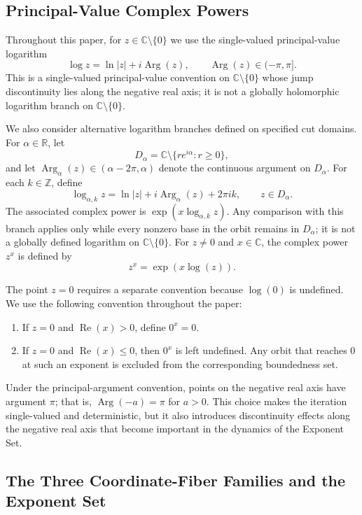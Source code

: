 \documentclass[12pt,a4paper]{amsart}
\theoremstyle{remark}
\newcommand{\C}{\mathbb{C}}
\newcommand{\R}{\mathbb{R}}
\newcommand{\Z}{\mathbb{Z}}
\begin{document}
\subsection{Principal-Value Complex Powers}

Throughout this paper, for $z\in\C\setminus\{0\}$ we use the single-valued
principal-value logarithm
\[
\log z=\ln|z|+i\operatorname{Arg}(z),
\qquad
\operatorname{Arg}(z)\in(-\pi,\pi].
\]
This is a single-valued principal-value convention on
$\C\setminus\{0\}$ whose jump discontinuity lies along the negative real
axis; it is not a globally holomorphic logarithm branch on
$\C\setminus\{0\}$.

We also consider alternative logarithm branches defined on specified cut
domains. For $\alpha\in\R$, let
\[
D_\alpha
=
\C\setminus\{re^{i\alpha}:r\ge0\},
\]
and let $\operatorname{Arg}_\alpha(z)\in(\alpha-2\pi,\alpha)$ denote the
continuous argument on $D_\alpha$. For each $k\in\Z$, define
\[
\log_{\alpha,k}z
=
\ln|z|+i\operatorname{Arg}_\alpha(z)+2\pi i k,
\qquad z\in D_\alpha.
\]
The associated complex power is $\exp(x\log_{\alpha,k}z)$. Any comparison
with this branch applies only while every nonzero base in the orbit remains in
$D_\alpha$; it is not a globally defined logarithm on $\C\setminus\{0\}$.
For $z\ne 0$ and $x\in\C$, the complex power $z^x$ is defined by
\[
z^x=\exp(x\log(z)).
\]

The point $z=0$ requires a separate convention because $\log(0)$ is undefined.
We use the following convention throughout the paper:
\begin{enumerate}
    \item If $z=0$ and $\operatorname{Re}(x)>0$, define $0^x=0$.
    \item If $z=0$ and $\operatorname{Re}(x)\le 0$, then $0^x$ is left
    undefined. Any orbit that reaches $0$ at such an exponent is excluded
    from the corresponding boundedness set.
\end{enumerate}

Under the principal-argument convention, points on the negative real axis have
argument $\pi$; that is, $\operatorname{Arg}(-a)=\pi$ for $a>0$. This choice makes the
iteration single-valued and deterministic, but it also introduces
discontinuity effects along the negative real axis that become important in
the dynamics of the Exponent Set.

\subsection{The Three Coordinate-Fiber Families and the Exponent Set}
\end{document}
